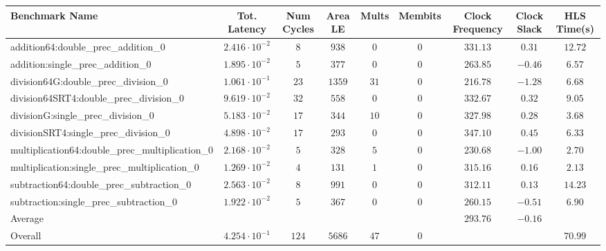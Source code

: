 \begin{tabular}{|l|c|c|c|c|c|c|c|c|}
\hline
Benchmark Name                                   & Tot. Latency            & Num Cycles & Area LE  & Mults  & Membits & Clock Frequency & Clock Slack & HLS Time(s) \\
\hline
addition64:double\_prec\_addition\_0             & $ 2.416 \cdot 10^{-2} $ & $ 8      $ & $ 938  $ & $ 0  $ & $ 0   $ & $ 331.13      $ & $ 0.31    $ & $ 12.72   $ \\
addition:single\_prec\_addition\_0               & $ 1.895 \cdot 10^{-2} $ & $ 5      $ & $ 377  $ & $ 0  $ & $ 0   $ & $ 263.85      $ & $ -0.46   $ & $ 6.57    $ \\
division64G:double\_prec\_division\_0            & $ 1.061 \cdot 10^{-1} $ & $ 23     $ & $ 1359 $ & $ 31 $ & $ 0   $ & $ 216.78      $ & $ -1.28   $ & $ 6.68    $ \\
division64SRT4:double\_prec\_division\_0         & $ 9.619 \cdot 10^{-2} $ & $ 32     $ & $ 558  $ & $ 0  $ & $ 0   $ & $ 332.67      $ & $ 0.32    $ & $ 9.05    $ \\
divisionG:single\_prec\_division\_0              & $ 5.183 \cdot 10^{-2} $ & $ 17     $ & $ 344  $ & $ 10 $ & $ 0   $ & $ 327.98      $ & $ 0.28    $ & $ 3.68    $ \\
divisionSRT4:single\_prec\_division\_0           & $ 4.898 \cdot 10^{-2} $ & $ 17     $ & $ 293  $ & $ 0  $ & $ 0   $ & $ 347.10      $ & $ 0.45    $ & $ 6.33    $ \\
multiplication64:double\_prec\_multiplication\_0 & $ 2.168 \cdot 10^{-2} $ & $ 5      $ & $ 328  $ & $ 5  $ & $ 0   $ & $ 230.68      $ & $ -1.00   $ & $ 2.70    $ \\
multiplication:single\_prec\_multiplication\_0   & $ 1.269 \cdot 10^{-2} $ & $ 4      $ & $ 131  $ & $ 1  $ & $ 0   $ & $ 315.16      $ & $ 0.16    $ & $ 2.13    $ \\
subtraction64:double\_prec\_subtraction\_0       & $ 2.563 \cdot 10^{-2} $ & $ 8      $ & $ 991  $ & $ 0  $ & $ 0   $ & $ 312.11      $ & $ 0.13    $ & $ 14.23   $ \\
subtraction:single\_prec\_subtraction\_0         & $ 1.922 \cdot 10^{-2} $ & $ 5      $ & $ 367  $ & $ 0  $ & $ 0   $ & $ 260.15      $ & $ -0.51   $ & $ 6.90    $ \\
\hline
Average                                          & $                     $ & $        $ & $      $ & $    $ & $     $ & $ 293.76      $ & $ -0.16   $ & $         $ \\
\hline
Overall                                          & $ 4.254 \cdot 10^{-1} $ & $ 124    $ & $ 5686 $ & $ 47 $ & $ 0   $ & $             $ & $         $ & $ 70.99   $ \\
\hline
\end{tabular}
